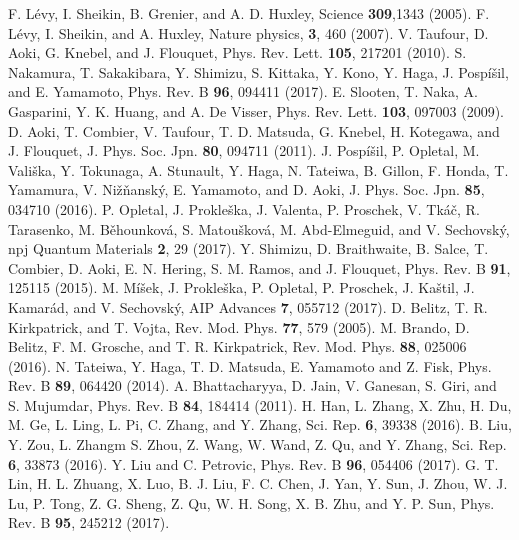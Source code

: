 \documentclass[twocolumn,showpacs,preprintnumbers,amsmath,amssymb]{revtex4}
\begin{document}
\begin{references}
F. L{\'e}vy, I. Sheikin, B. Grenier, and A. D. Huxley, Science {\bf 309},1343 (2005).%
F. L{\'e}vy, I. Sheikin, and A. Huxley, Nature physics, {\bf 3}, 460 (2007).%
V. Taufour, D. Aoki, G. Knebel, and J. Flouquet, Phys. Rev. Lett. {\bf 105}, 217201 (2010). %
S. Nakamura, T. Sakakibara, Y. Shimizu, S. Kittaka, Y. Kono, Y. Haga, J. Posp{\'i}\v{s}il, and E. Yamamoto, Phys. Rev. B {\bf 96}, 094411 (2017).%
E. Slooten, T. Naka, A. Gasparini, Y. K. Huang, and A. De Visser, Phys. Rev. Lett. {\bf 103}, 097003 (2009).%
D. Aoki, T. Combier, V. Taufour, T. D. Matsuda, G. Knebel, H. Kotegawa, and J. Flouquet, J. Phys. Soc. Jpn. {\bf 80}, 094711 (2011).%
J. Posp{\'i}\v{s}il, P. Opletal, M. Vali{\v{s}}ka, Y. Tokunaga, A. Stunault, Y. Haga, N. Tateiwa, B. Gillon, F. Honda, T. Yamamura, V. Ni\v{z}\v{n}ansk{\'y}, E. Yamamoto, and D. Aoki, J. Phys. Soc. Jpn. {\bf 85}, 034710 (2016).
P. Opletal, J. Prokle{\v{s}}ka, J. Valenta, P. Proschek, V. Tk{\'a}{\v{c}}, R. Tarasenko, M. B{\v{e}}hounkov{\'a}, S. Matou{\v{s}}kov{\'a}, M. Abd-Elmeguid, and V. Sechovsk{\'y}, npj Quantum Materials {\bf 2}, 29 (2017). %
 Y. Shimizu, D. Braithwaite, B. Salce, T. Combier, D. Aoki, E. N. Hering, S. M. Ramos, and J. Flouquet, Phys. Rev. B {\bf 91}, 125115 (2015). %
M. M{\'i}{\v{s}}ek, J. Prokle{\v{s}}ka, P. Opletal, P. Proschek, J. Ka{\v{s}}til, J. Kamar{\'{a}}d, and V. Sechovsk{\'y}, AIP Advances {\bf 7}, 055712 (2017).%
   D. Belitz, T. R. Kirkpatrick, and T. Vojta, Rev. Mod. Phys. {\bf 77}, 579 (2005).
M. Brando, D. Belitz, F. M. Grosche, and T. R. Kirkpatrick, Rev. Mod. Phys. {\bf 88}, 025006 (2016).
N. Tateiwa, Y. Haga, T. D. Matsuda, E. Yamamoto and Z. Fisk, Phys. Rev. B {\bf 89}, 064420 (2014).
 A. Bhattacharyya, D. Jain, V. Ganesan, S. Giri, and S. Mujumdar, Phys. Rev. B {\bf 84}, 184414 (2011).%
 H. Han, L. Zhang, X. Zhu, H. Du, M. Ge, L. Ling, L. Pi, C. Zhang, and Y. Zhang, Sci. Rep. {\bf 6}, 39338 (2016). %
B. Liu, Y. Zou, L. Zhangm S. Zhou, Z. Wang, W. Wand, Z. Qu, and Y. Zhang, Sci. Rep. {\bf 6}, 33873 (2016).%
 Y. Liu and C. Petrovic, Phys. Rev. B {\bf 96}, 054406 (2017). %
 G. T. Lin, H. L. Zhuang, X. Luo, B. J. Liu, F. C. Chen, J. Yan, Y. Sun, J. Zhou, W. J. Lu, P. Tong, Z. G. Sheng, Z. Qu, W. H. Song, X. B. Zhu, and Y. P. Sun, Phys. Rev. B {\bf 95}, 245212 (2017). %

\end{references}
\end{document}
